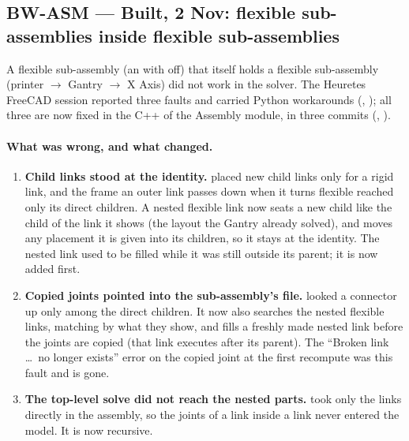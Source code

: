 \subsection{BW-ASM --- Built, 2 Nov: flexible sub-assemblies inside flexible sub-assemblies}\label{sec:asm-nested-built}

A flexible sub-assembly (an  with  off) that itself holds a flexible sub-assembly
(printer $\rightarrow$ Gantry $\rightarrow$ X Axis) did not work in the solver. The Heuretes FreeCAD session reported
three faults and carried Python workarounds (, ); all three are now fixed
in the C++ of the Assembly module, in three commits (, ).

\paragraph{What was wrong, and what changed.}
\begin{enumerate}[nosep]
  \item \textbf{Child links stood at the identity.}  placed new child links only for a
        rigid link, and the frame an outer link passes down when it turns flexible reached only its direct children.
        A nested flexible link now seats a new child like the child of the link it shows (the layout the Gantry
        already solved), and moves any placement it is given into its children, so it stays at the identity.
        The nested link used to be filled while it was still outside its parent; it is now added first.
  \item \textbf{Copied joints pointed into the sub-assembly's file.}  looked a connector up
        only among the direct children. It now also searches the nested flexible links, matching by what they show,
        and fills a freshly made nested link before the joints are copied (that link executes after its parent).
        The ``Broken link \ldots\ no longer exists'' error on the copied joint at the first recompute was this
        fault and is gone.
  \item \textbf{The top-level solve did not reach the nested parts.}  took
        only the links directly in the assembly, so the joints of a link inside a link never entered the model.
        It is now recursive.
\end{enumerate}

